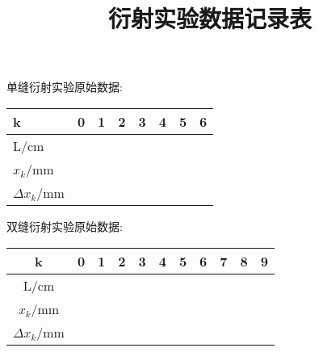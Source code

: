 \documentclass[12pt,a4paper,oneside]{ctexart}
\title{衍射实验数据记录表}
\author{}
\begin{document}
\maketitle
\par
单缝衍射实验原始数据:
\begin{center}
\begin{table*}[h]
    \begin{tabular}{|p{1.5cm}|p{1.5cm}|p{1.5cm}|p{1.5cm}|p{1.5cm}|p{1.5cm}|p{1.5cm}|p{1.5cm}|}
    \hline
    k&0&1&2&3&4&5&6\\
    \hline
    L/cm&&&&&&&\\
    \hline
    $x_k$/mm&&&&&&&\\
    \hline    
    $\Delta x_k$/mm&&&&&&&\\
    \hline   
    \end{tabular}
\end{table*}
\end{center}
\par
双缝衍射实验原始数据:
\begin{center}
    \begin{table*}[h]

    \begin{tabular}{|c|p{1cm}|p{1cm}|p{1cm}|p{1cm}|p{1cm}|p{1cm}|p{1cm}|p{1cm}|p{1cm}|p{1cm}|}
    \hline
    k&0&1&2&3&4&5&6&7&8&9\\
    \hline
    L/cm&&& & &  & &&&&\\
    \hline
    $x_k$/mm&&&&&&&&&&\\
    \hline    
    $\Delta x_k$/mm&&&&&&&&&&\\
    \hline   
    \end{tabular}
     
\end{table*}
\end{center}
\end{document}
